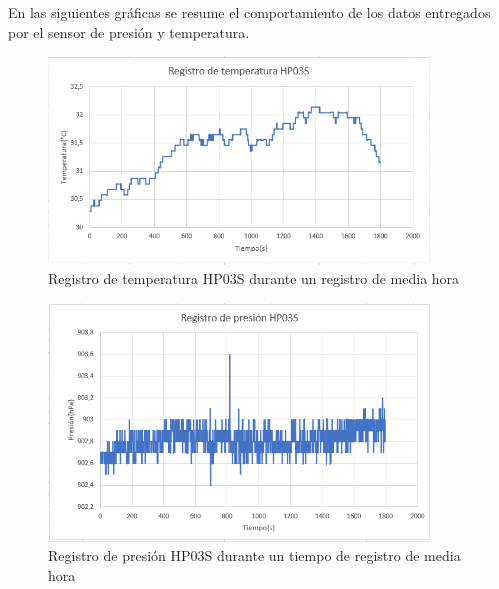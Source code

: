 En las siguientes gráficas se resume el comportamiento de los datos entregados por el sensor de presión y temperatura.

\begin{figure}[H]
\includegraphics[width=0.9\textwidth]{Figs/TEMPERATURA.PNG} 
\centering
\caption{Registro de temperatura HP03S durante un registro de media hora}
\label{temp}
\end{figure}

\begin{figure}[H]
\includegraphics[width=0.9\textwidth]{Figs/presion.PNG} 
\centering
\caption{Registro de presión HP03S durante un tiempo de registro de media hora}
\label{pre}
\end{figure}


